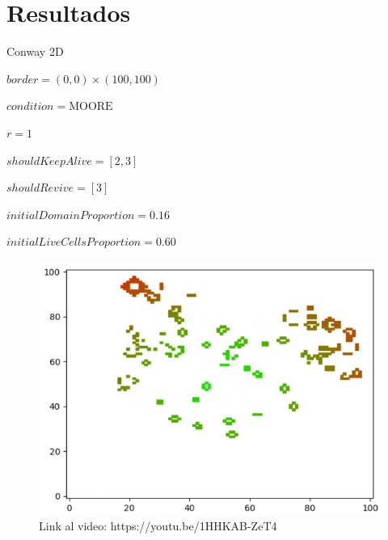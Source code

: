 \section{Resultados}


\begin{frame}{Conway 2D}
    \begin{multicols}{2}
        {
            $border = (0, 0) \times (100, 100)$

            $condition = \text{MOORE}$

            $r = 1$

            $shouldKeepAlive = [2, 3]$

            $shouldRevive = [3]$

            $initialDomainProportion = 0.16$

            $initialLiveCellsProportion = 0.60$
        }

        {\begin{figure}[H]
             \centering
             \includegraphics[width=1\linewidth]{pic/conway2d/thumbnail_i60}
             \captionsetup{labelformat=empty}
             \caption{Link al video: https://youtu.be/1HHKAB-ZeT4}
             \label{fig:conway2d:thumbnail}
        \end{figure}}
    \end{multicols}
\end{frame}

